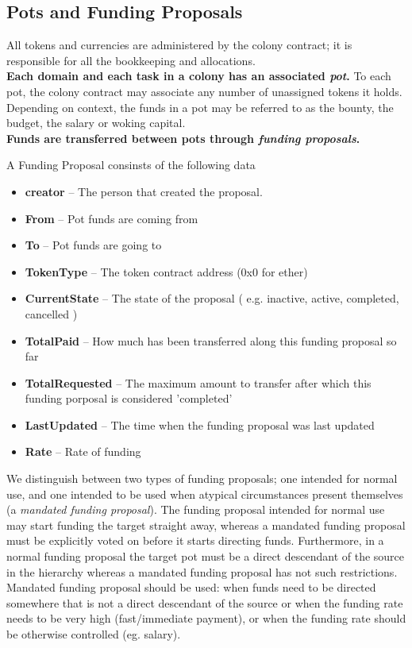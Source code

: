 \subsection{Pots and Funding Proposals}
All tokens and currencies are administered by the colony contract; it is responsible for all the bookkeeping and allocations.\\
\textbf{Each domain and each task in a colony has an associated \emph{pot}.} To each pot, the colony contract may associate any number of unassigned tokens it holds. Depending on context, the funds in a pot may be referred to as the bounty, the budget, the salary or woking capital.\\
\textbf{Funds are transferred between pots through \emph{funding proposals}.}
\begin{description}
 \item A Funding Proposal consinsts of the following data
 \begin{itemize}
  \item \textbf{creator}	--	The person that created the proposal.
  \item \textbf{From}	--	Pot funds are coming from
  \item \textbf{To}	--	Pot funds are going to
  \item \textbf{TokenType}	--	The token contract address (0x0 for ether)
  \item \textbf{CurrentState}	--	The state of the proposal ( e.g. inactive, active, completed, cancelled )
  \item \textbf{TotalPaid}	--	How much has been transferred along this funding proposal so far
  \item \textbf{TotalRequested}	--	The maximum amount to transfer after which this funding porposal is considered 'completed'
  \item \textbf{LastUpdated}	--	The time when the funding proposal was last updated
  \item \textbf{Rate}	--	Rate of funding
 \end{itemize}

\end{description}
We distinguish between two types of funding proposals; one intended for normal use, and one intended to be used when atypical circumstances present themselves (a \emph{mandated funding proposal}). The funding proposal intended for normal use may start funding the target straight away, whereas a mandated funding proposal must be explicitly voted on before it starts directing funds. Furthermore, in a normal funding proposal the target pot must be a direct descendant of the source in the hierarchy whereas a mandated funding proposal has not such restrictions.\\
Mandated funding proposal should be used: when funds need to be directed somewhere that is not a direct descendant of the source or when the funding rate needs to be very high (fast/immediate payment), or when the funding rate should be otherwise controlled (eg. salary).\\

